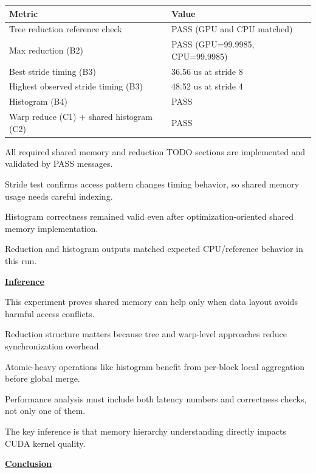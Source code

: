 \documentclass[12pt]{article}
\begin{document}
\begin{center}
\begin{tabular}{|p{7cm}|p{5cm}|}
\hline
\textbf{Metric} & \textbf{Value} \\
\hline
Tree reduction reference check & PASS (GPU and CPU matched) \\
\hline
Max reduction (B2) & PASS (GPU=99.9985, CPU=99.9985) \\
\hline
Best stride timing (B3) & 36.56 us at stride 8 \\
\hline
Highest observed stride timing (B3) & 48.52 us at stride 4 \\
\hline
Histogram (B4) & PASS \\
\hline
Warp reduce (C1) + shared histogram (C2) & PASS \\
\hline
\end{tabular}
\end{center}

All required shared memory and reduction TODO sections are implemented and validated by PASS messages.

Stride test confirms access pattern changes timing behavior, so shared memory usage needs careful indexing.

Histogram correctness remained valid even after optimization-oriented shared memory implementation.

Reduction and histogram outputs matched expected CPU/reference behavior in this run.

\vspace{0.8cm}

\textbf{\Large \underline{Inference}}

\vspace{0.5cm}

This experiment proves shared memory can help only when data layout avoids harmful access conflicts.

Reduction structure matters because tree and warp-level approaches reduce synchronization overhead.

Atomic-heavy operations like histogram benefit from per-block local aggregation before global merge.

Performance analysis must include both latency numbers and correctness checks, not only one of them.

The key inference is that memory hierarchy understanding directly impacts CUDA kernel quality.

\vspace{0.8cm}

\textbf{\Large \underline{Conclusion}}
\end{document}
